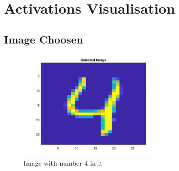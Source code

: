 \documentclass{article}
\begin{document}
\begin{figure}[H]
\hspace{0.05\textwidth}
\end{figure}

\section{Activations Visualisation}
\subsection{Image Choosen}
\begin{figure}[H]
\includegraphics[width=0.65\textwidth]{num.jpg}
\centering
\caption{Image with number 4 in it}
\end{figure}
\end{document}
